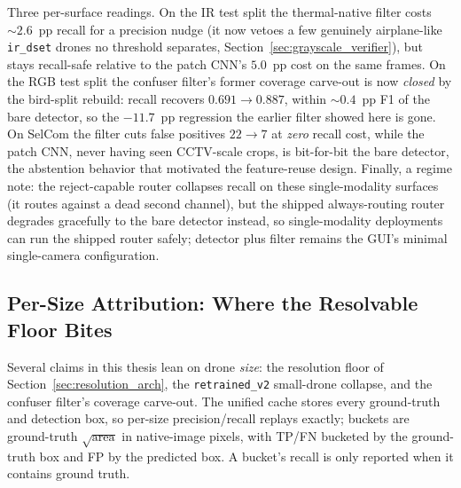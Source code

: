 Three per-surface readings. On the IR test split the thermal-native filter costs ${\sim}2.6$~pp recall for a precision nudge (it now vetoes a few genuinely airplane-like \texttt{ir\_dset} drones no threshold separates, Section~\ref{sec:grayscale_verifier}), but stays recall-safe relative to the patch CNN's $5.0$~pp cost on the same frames. On the RGB test split the confuser filter's former coverage carve-out is now \emph{closed} by the bird-split rebuild: recall recovers $0.691 \to 0.887$, within ${\sim}0.4$~pp F1 of the bare detector, so the $-11.7$~pp regression the earlier filter showed here is gone. On SelCom the filter cuts false positives $22 \to 7$ at \emph{zero} recall cost, while the patch CNN, never having seen CCTV-scale crops, is bit-for-bit the bare detector, the abstention behavior that motivated the feature-reuse design. Finally, a regime note: the reject-capable router collapses recall on these single-modality surfaces (it routes against a dead second channel), but the shipped always-routing router degrades gracefully to the bare detector instead, so single-modality deployments can run the shipped router safely; detector plus filter remains the GUI's minimal single-camera configuration.

\subsection{Per-Size Attribution: Where the Resolvable Floor Bites}
\label{sec:per_size}

Several claims in this thesis lean on drone \emph{size}: the resolution floor of Section~\ref{sec:resolution_arch}, the \texttt{retrained\_v2} small-drone collapse, and the confuser filter's coverage carve-out. The unified cache stores every ground-truth and detection box, so per-size precision/recall replays exactly; buckets are ground-truth $\sqrt{\text{area}}$ in native-image pixels, with TP/FN bucketed by the ground-truth box and FP by the predicted box. A bucket's recall is only reported when it contains ground truth.

